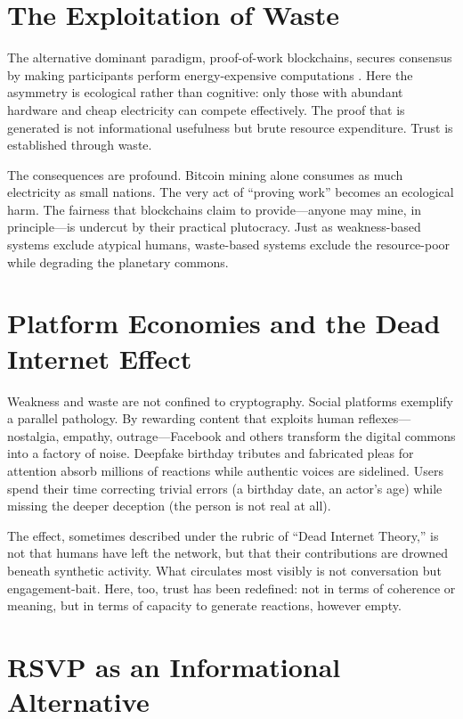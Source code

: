 \documentclass{book}
\begin{document}
\section{The Exploitation of Waste}

The alternative dominant paradigm, proof-of-work blockchains, secures consensus by making participants perform energy-expensive computations \cite{nakamoto2008}. Here the asymmetry is ecological rather than cognitive: only those with abundant hardware and cheap electricity can compete effectively. The proof that is generated is not informational usefulness but brute resource expenditure. Trust is established through waste.

The consequences are profound. Bitcoin mining alone consumes as much electricity as small nations. The very act of ``proving work'' becomes an ecological harm. The fairness that blockchains claim to provide—anyone may mine, in principle—is undercut by their practical plutocracy. Just as weakness-based systems exclude atypical humans, waste-based systems exclude the resource-poor while degrading the planetary commons.

\section{Platform Economies and the Dead Internet Effect}

Weakness and waste are not confined to cryptography. Social platforms exemplify a parallel pathology. By rewarding content that exploits human reflexes—nostalgia, empathy, outrage—Facebook and others transform the digital commons into a factory of noise. Deepfake birthday tributes and fabricated pleas for attention absorb millions of reactions while authentic voices are sidelined. Users spend their time correcting trivial errors (a birthday date, an actor’s age) while missing the deeper deception (the person is not real at all).

The effect, sometimes described under the rubric of ``Dead Internet Theory,'' is not that humans have left the network, but that their contributions are drowned beneath synthetic activity. What circulates most visibly is not conversation but engagement-bait. Here, too, trust has been redefined: not in terms of coherence or meaning, but in terms of capacity to generate reactions, however empty.

\section{RSVP as an Informational Alternative}
\end{document}
